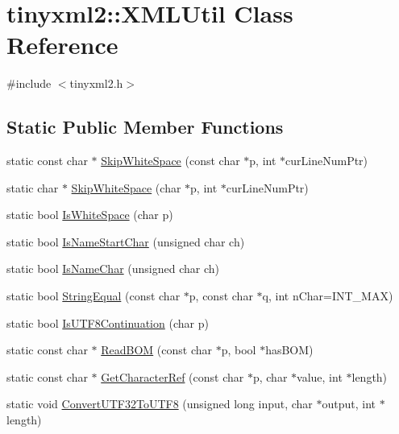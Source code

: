 \hypertarget{classtinyxml2_1_1_x_m_l_util}{}\section{tinyxml2\+:\+:X\+M\+L\+Util Class Reference}
\label{classtinyxml2_1_1_x_m_l_util}


{\ttfamily \#include $<$tinyxml2.\+h$>$}

\subsection*{Static Public Member Functions}
\begin{DoxyCompactItemize}
\item 
static const char $\ast$ \hyperlink{classtinyxml2_1_1_x_m_l_util_ab626a194b3523a5ba8b9dbaa2a165202}{Skip\+White\+Space} (const char $\ast$p, int $\ast$cur\+Line\+Num\+Ptr)
\item 
static char $\ast$ \hyperlink{classtinyxml2_1_1_x_m_l_util_abb6cb3e71f88efca82cb7157367fd91e}{Skip\+White\+Space} (char $\ast$p, int $\ast$cur\+Line\+Num\+Ptr)
\item 
static bool \hyperlink{classtinyxml2_1_1_x_m_l_util_a357ec3af8fc433d19023a815f45e8e33}{Is\+White\+Space} (char p)
\item 
static bool \hyperlink{classtinyxml2_1_1_x_m_l_util_abe106a69ac4d942a4381a4d9dfd0e0bd}{Is\+Name\+Start\+Char} (unsigned char ch)
\item 
static bool \hyperlink{classtinyxml2_1_1_x_m_l_util_a04b17341538fa11752f24b4301d19485}{Is\+Name\+Char} (unsigned char ch)
\item 
static bool \hyperlink{classtinyxml2_1_1_x_m_l_util_acfcd287cacfd2533e1bc9ea4dfb56602}{String\+Equal} (const char $\ast$p, const char $\ast$q, int n\+Char=I\+N\+T\+\_\+\+M\+AX)
\item 
static bool \hyperlink{classtinyxml2_1_1_x_m_l_util_ad7fd82e0fe610d73ef7bf9f359f104a3}{Is\+U\+T\+F8\+Continuation} (char p)
\item 
static const char $\ast$ \hyperlink{classtinyxml2_1_1_x_m_l_util_ae9bcb2bc3cd6475fdc644c8c17790555}{Read\+B\+OM} (const char $\ast$p, bool $\ast$has\+B\+OM)
\item 
static const char $\ast$ \hyperlink{classtinyxml2_1_1_x_m_l_util_a5a96e5144a8d693dc4bcd783d9964648}{Get\+Character\+Ref} (const char $\ast$p, char $\ast$value, int $\ast$length)
\item 
static void \hyperlink{classtinyxml2_1_1_x_m_l_util_a31c00d5c5dfb38382de1dfcaf4be3595}{Convert\+U\+T\+F32\+To\+U\+T\+F8} (unsigned long input, char $\ast$output, int $\ast$length)

\end{DoxyCompactItemize}
